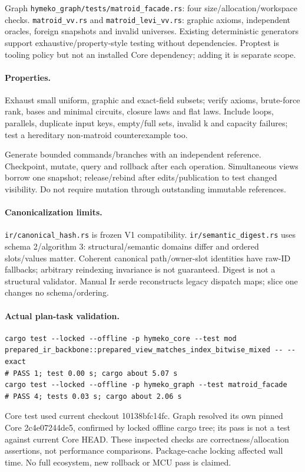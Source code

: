 \documentclass[10pt,a4paper]{article}
\newcommand{\code}[1]{{\small\nolinkurl{#1}}}
\begin{document}
Graph \code{hymeko_graph/tests/matroid_facade.rs}: four size/allocation/workspace checks. \code{matroid_vv.rs} and \code{matroid_levi_vv.rs}: graphic axioms, independent oracles, foreign snapshots and invalid universes. Existing deterministic generators support exhaustive/property-style testing without dependencies. Proptest is tooling policy but not an installed Core dependency; adding it is separate scope.

\paragraph{Properties.}
Exhaust small uniform, graphic and exact-field subsets; verify axioms, brute-force rank, bases and minimal circuits, closure laws and flat laws. Include loops, parallels, duplicate input keys, empty/full sets, invalid k and capacity failures; test a hereditary non-matroid counterexample too.

Generate bounded commands/branches with an independent reference. Checkpoint, mutate, query and rollback after each operation. Simultaneous views borrow one snapshot; release/rebind after edits/publication to test changed visibility. Do not require mutation through outstanding immutable references.

\paragraph{Canonicalization limits.}
\code{ir/canonical_hash.rs} is frozen V1 compatibility. \code{ir/semantic_digest.rs} uses schema 2/algorithm 3: structural/semantic domains differ and ordered slots/values matter. Coherent canonical path/owner-slot identities have raw-ID fallbacks; arbitrary reindexing invariance is not guaranteed. Digest is not a structural validator. Manual Ir serde reconstructs legacy dispatch maps; slice one changes no schema/ordering.

\paragraph{Actual plan-task validation.}
\begin{lstlisting}
cargo test --locked --offline -p hymeko_core --test mod prepared_ir_backbone::prepared_view_matches_index_bitwise_mixed -- --exact
# PASS 1; test 0.00 s; cargo about 5.07 s
cargo test --locked --offline -p hymeko_graph --test matroid_facade
# PASS 4; tests 0.03 s; cargo about 2.06 s
\end{lstlisting}
Core test used current checkout 10138bfc14fc. Graph resolved its own pinned Core 2c4e07244de5, confirmed by locked offline cargo tree; its pass is not a test against current Core HEAD. These inspected checks are correctness/allocation assertions, not performance comparisons. Package-cache locking affected wall time. No full ecosystem, new rollback or MCU pass is claimed.
\end{document}
